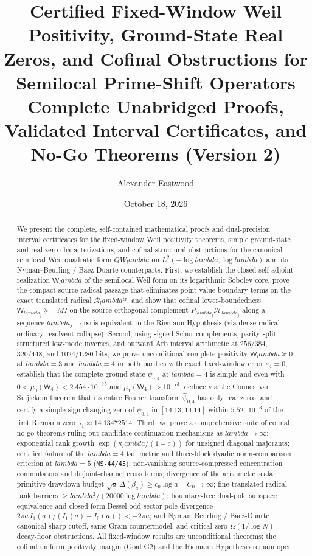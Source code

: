 \documentclass[11pt]{article}
\title{\textbf{Certified Fixed-Window Weil Positivity, Ground-State Real Zeros, and Cofinal Obstructions for Semilocal Prime-Shift Operators}\\[6pt]
\large Complete Unabridged Proofs, Validated Interval Certificates, and No-Go Theorems (Version 2)}
\author{Alexander Eastwood}
\date{October 18, 2026}
\def\lambda{lambda}%
\theoremstyle{remark}
\begin{document}
\maketitle

\begin{abstract}
We present the complete, self-contained mathematical proofs and dual-precision interval certificates for the fixed-window Weil positivity theorems, simple ground-state and real-zero characterizations, and cofinal structural obstructions for the canonical semilocal Weil quadratic form $QW_\lambda$ on $L^2(-\log\lambda,\log\lambda)$ and its Nyman--Beurling / B\'aez-Duarte counterparts. First, we establish the closed self-adjoint realization $\mathsf W_\lambda$ of the semilocal Weil form on its logarithmic Sobolev core, prove the compact-source radical passage that eliminates point-value boundary terms on the exact translated radical $\mathcal R_\lambda^{\mathrm{tr}}$, and show that cofinal lower-boundedness $\mathsf W_{\lambda_j}\succeq -M I$ on the source-orthogonal complement $P_{\lambda_j}\mathcal H_{\lambda_j}$ along a sequence $\lambda_j\to\infty$ is equivalent to the Riemann Hypothesis (via dense-radical ordinary resolvent collapse). Second, using signed Schur complements, parity-split structured low-mode inverses, and outward Arb interval arithmetic at $256/384$, $320/448$, and $1024/1280$ bits, we prove unconditional complete positivity $\mathsf W_\lambda\succeq 0$ at $\lambda=3$ and $\lambda=4$ in both parities with exact fixed-window error $\varepsilon_4=0$, establish that the complete ground state $\psi_{0,4}$ at $\lambda=4$ is simple and even with $0<\mu_0(\mathsf W_4)<2.454\cdot 10^{-75}$ and $\mu_1(\mathsf W_4)>10^{-73}$, deduce via the Connes--van Suijlekom theorem that its entire Fourier transform $\widehat{\psi}_{0,4}$ has only real zeros, and certify a simple sign-changing zero of $\widehat{\psi}_{0,4}$ in $[14.13,14.14]$ within $5.52\cdot 10^{-3}$ of the first Riemann zero $\gamma_1\approx 14.13472514$. Third, we prove a comprehensive suite of cofinal no-go theorems ruling out candidate continuation mechanisms as $\lambda\to\infty$: exponential rank growth $\exp(\kappa_\lambda/(1-c))$ for unsigned diagonal majorants; certified failure of the $\lambda=4$ tail metric and three-block dyadic norm-comparison criterion at $\lambda=5$ (\texttt{NS-44/45}); non-vanishing source-compressed concentration commutators and disjoint-channel cross terms; divergence of the arithmetic scalar primitive-drawdown budget $\sqrt{a}\,\Delta(\beta_a)\ge c_0\log a-C_0\to\infty$; fine translated-radical rank barriers $\ge \lambda^2/(20000\log\lambda)$; boundary-free dual-pole subspace equivalence and closed-form Bessel odd-sector pole divergence $2\pi a\,I_1(a)/(I_1(a)-I_0(a))<-2\pi a$; and Nyman--Beurling / B\'aez-Duarte canonical sharp-cutoff, same-Gram countermodel, and critical-zero $\Omega(1/\log N)$ decay-floor obstructions. All fixed-window results are unconditional theorems; the cofinal uniform positivity margin (Goal G2) and the Riemann Hypothesis remain open.
\end{abstract}
\end{document}
